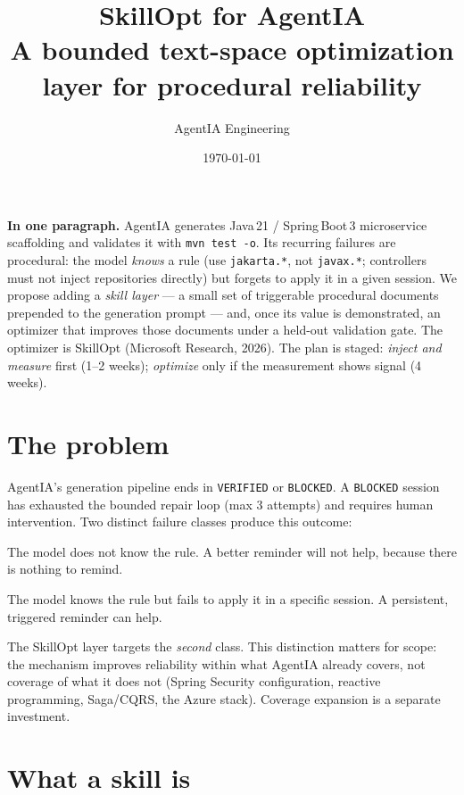 \documentclass[11pt,a4paper]{article}
\title{\vspace{-2cm}\textbf{SkillOpt for AgentIA}\\[0.2em]
\large A bounded text-space optimization layer for procedural reliability}
\author{AgentIA Engineering}
\date{\today}
\begin{document}
\maketitle
\thispagestyle{fancy}

\begin{keybox}
\textbf{In one paragraph.} AgentIA generates Java\,21 / Spring\,Boot\,3
microservice scaffolding and validates it with \texttt{mvn test -o}. Its
recurring failures are procedural: the model \emph{knows} a rule (use
\texttt{jakarta.*}, not \texttt{javax.*}; controllers must not inject
repositories directly) but forgets to apply it in a given session. We
propose adding a \emph{skill layer} --- a small set of triggerable
procedural documents prepended to the generation prompt --- and, once
its value is demonstrated, an optimizer that improves those documents
under a held-out validation gate. The optimizer is SkillOpt
(Microsoft Research, 2026). The plan is staged: \emph{inject and
measure} first (1--2 weeks); \emph{optimize} only if the measurement
shows signal (4 weeks).
\end{keybox}

\section{The problem}

AgentIA's generation pipeline ends in \texttt{VERIFIED} or
\texttt{BLOCKED}. A \texttt{BLOCKED} session has exhausted the bounded
repair loop (max 3 attempts) and requires human intervention. Two
distinct failure classes produce this outcome:

\begin{description}[leftmargin=1.2em]
  \item[Capability gap.] The model does not know the rule. A better
  reminder will not help, because there is nothing to remind.
  \item[Application gap.] The model knows the rule but fails to apply
  it in a specific session. A persistent, triggered reminder can help.
\end{description}

The SkillOpt layer targets the \emph{second} class. This distinction
matters for scope: the mechanism improves reliability within what
AgentIA already covers, not coverage of what it does not (Spring
Security configuration, reactive programming, Saga/CQRS, the Azure
stack). Coverage expansion is a separate investment.

\section{What a skill is}
\end{document}
